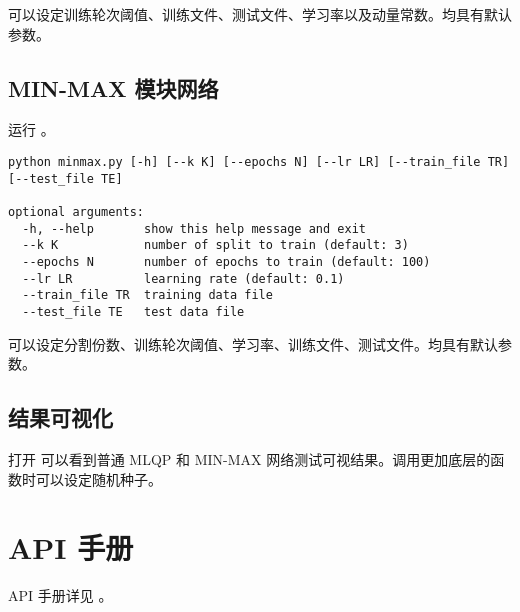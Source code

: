     可以设定训练轮次阈值、训练文件、测试文件、学习率以及动量常数。均具有默认参数。

    \subsection{MIN-MAX 模块网络}
    运行 。

    \begin{lstlisting}[style=commandshell]
python minmax.py [-h] [--k K] [--epochs N] [--lr LR] [--train_file TR] [--test_file TE]

optional arguments:
  -h, --help       show this help message and exit
  --k K            number of split to train (default: 3)
  --epochs N       number of epochs to train (default: 100)
  --lr LR          learning rate (default: 0.1)
  --train_file TR  training data file
  --test_file TE   test data file
    \end{lstlisting}

    可以设定分割份数、训练轮次阈值、学习率、训练文件、测试文件。均具有默认参数。

    \subsection{结果可视化}

    打开  可以看到普通 MLQP 和 MIN-MAX 网络测试可视结果。调用更加底层的函数时可以设定随机种子。

    \section{API 手册}

    API 手册详见 。
